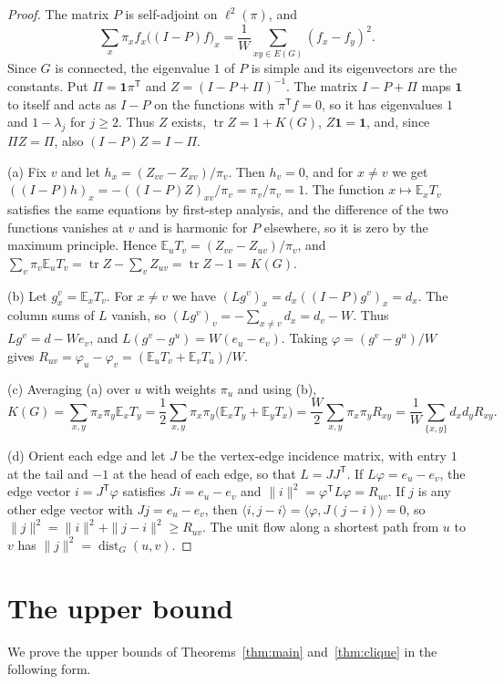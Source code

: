 \documentclass[11pt]{amsart}
\numberwithin{equation}{section}
\theoremstyle{remark}
\newcommand{\E}{\mathbb E}
\newcommand{\dist}{\operatorname{dist}}
\begin{document}
\begin{proof}
The matrix $P$ is self-adjoint on $\ell^2(\pi)$, and
\begin{equation}\label{eq:dirichlet}
\sum_x\pi_xf_x\bigl((I-P)f\bigr)_x=\frac1W\sum_{xy\in E(G)}(f_x-f_y)^2 .
\end{equation}
Since $G$ is connected, the eigenvalue $1$ of $P$ is simple and its eigenvectors are the constants. Put $\Pi=\mathbf 1\pi^{\mathsf T}$ and $Z=(I-P+\Pi)^{-1}$. The matrix $I-P+\Pi$ maps $\mathbf 1$ to itself and acts as $I-P$ on the functions with $\pi^{\mathsf T}f=0$, so it has eigenvalues $1$ and $1-\lambda_j$ for $j\ge2$. Thus $Z$ exists, $\operatorname{tr}Z=1+K(G)$, $Z\mathbf 1=\mathbf 1$, and, since $\Pi Z=\Pi$, also $(I-P)Z=I-\Pi$.

(a) Fix $v$ and let $h_x=(Z_{vv}-Z_{xv})/\pi_v$. Then $h_v=0$, and for $x\ne v$ we get $((I-P)h)_x=-((I-P)Z)_{xv}/\pi_v=\pi_v/\pi_v=1$. The function $x\mapsto\E_xT_v$ satisfies the same equations by first-step analysis, and the difference of the two functions vanishes at $v$ and is harmonic for $P$ elsewhere, so it is zero by the maximum principle. Hence $\E_uT_v=(Z_{vv}-Z_{uv})/\pi_v$, and $\sum_v\pi_v\E_uT_v=\operatorname{tr}Z-\sum_vZ_{uv}=\operatorname{tr}Z-1=K(G)$.

(b) Let $g^v_x=\E_xT_v$. For $x\ne v$ we have $(Lg^v)_x=d_x((I-P)g^v)_x=d_x$. The column sums of $L$ vanish, so $(Lg^v)_v=-\sum_{x\ne v}d_x=d_v-W$. Thus $Lg^v=d-We_v$, and $L(g^v-g^u)=W(e_u-e_v)$. Taking $\varphi=(g^v-g^u)/W$ gives $R_{uv}=\varphi_u-\varphi_v=(\E_uT_v+\E_vT_u)/W$.

(c) Averaging (a) over $u$ with weights $\pi_u$ and using (b),
\[
K(G)=\sum_{x,y}\pi_x\pi_y\E_xT_y=\frac12\sum_{x,y}\pi_x\pi_y\bigl(\E_xT_y+\E_yT_x\bigr)=\frac W2\sum_{x,y}\pi_x\pi_yR_{xy}=\frac1W\sum_{\{x,y\}}d_xd_yR_{xy}.
\]

(d) Orient each edge and let $J$ be the vertex-edge incidence matrix, with entry $1$ at the tail and $-1$ at the head of each edge, so that $L=JJ^{\mathsf T}$. If $L\varphi=e_u-e_v$, the edge vector $i=J^{\mathsf T}\varphi$ satisfies $Ji=e_u-e_v$ and $\|i\|^2=\varphi^{\mathsf T}L\varphi=R_{uv}$. If $j$ is any other edge vector with $Jj=e_u-e_v$, then $\langle i,j-i\rangle=\langle\varphi,J(j-i)\rangle=0$, so $\|j\|^2=\|i\|^2+\|j-i\|^2\ge R_{uv}$. The unit flow along a shortest path from $u$ to $v$ has $\|j\|^2=\dist_G(u,v)$.
\end{proof}

\section{The upper bound}\label{sec:upper}
We prove the upper bounds of Theorems~\ref{thm:main} and~\ref{thm:clique} in the following form.
\end{document}
